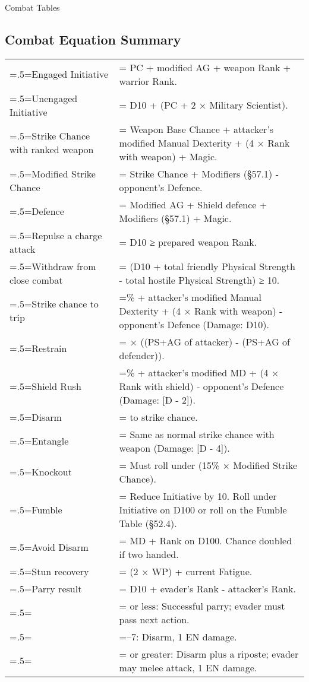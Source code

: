 \begin{Tables}{Combat Tables}
\begin{multicols}{3}
\section{Combat Equation Summary}
\begin{tabularx}{\columnwidth}{>{\hsize=.5\hsize\linewidth=\hsize}X>{\hsize=1.5\hsize\linewidth=\hsize}X}
Engaged Initiative			& PC + modified AG + weapon Rank + warrior Rank. \\
Unengaged Initiative			& D10 + (PC + 2 × Military Scientist). \\
Strike Chance with ranked weapon	& Weapon Base Chance + attacker’s modified Manual Dexterity + (4 × Rank with weapon) + Magic. \\
Modified Strike Chance			& Strike Chance + Modifiers (§57.1) - opponent’s Defence. \\
Defence					& Modified AG + Shield defence + Modifiers (§57.1) + Magic. \\
Repulse a charge attack			& D10 ≥ prepared weapon Rank.\\
Withdraw from close combat		& (D10 + total friendly Physical Strength - total hostile Physical Strength) ≥ 10. \\
Strike chance to trip			& 40\% + attacker’s modified Manual Dexterity + (4 × Rank with weapon) - opponent’s Defence (Damage: D10). \\
Restrain				& 3 × ((PS+AG of attacker) - (PS+AG of defender)). \\
Shield Rush				& 40\% + attacker’s modified MD + (4 × Rank with shield) - opponent’s Defence (Damage: [D - 2]). \\
Disarm					& -20 to strike chance. \\
Entangle				& Same as normal strike chance with weapon (Damage: [D - 4]). \\
Knockout				& Must roll under (15\% × Modified Strike Chance). \\
Fumble					& Reduce Initiative by 10. Roll under Initiative on D100 or roll on the Fumble Table (§52.4). \\
Avoid Disarm				& MD + Rank on D100. Chance doubled if two handed.\\
Stun recovery				& (2 × WP) + current Fatigue. \\
Parry result				& D10 + evader’s Rank - attacker’s Rank. \\
					& 3 or less: Successful parry; evader must pass next action. \\
					& 4–7: Disarm, 1 EN damage. \\
					& 8 or greater: Disarm plus a riposte; evader may melee attack, 1 EN damage. \\
\end{tabularx}


\end{multicols}
\end{Tables}
